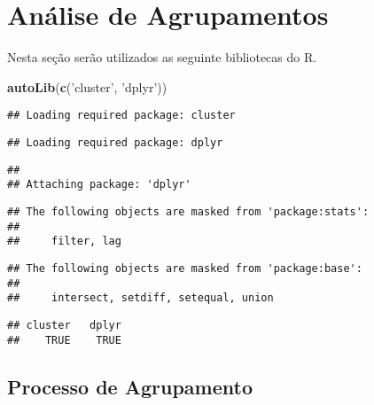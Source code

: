 \documentclass[]{book}
\newenvironment{Shaded}{\begin{snugshade}}{\end{snugshade}}
\newcommand{\KeywordTok}[1]{\textcolor[rgb]{0.13,0.29,0.53}{\textbf{{#1}}}}
\newcommand{\DataTypeTok}[1]{\textcolor[rgb]{0.13,0.29,0.53}{{#1}}}
\newcommand{\DecValTok}[1]{\textcolor[rgb]{0.00,0.00,0.81}{{#1}}}
\newcommand{\StringTok}[1]{\textcolor[rgb]{0.31,0.60,0.02}{{#1}}}
\newcommand{\NormalTok}[1]{{#1}}
\begin{document}
\chapter{Análise de Agrupamentos}\label{AA}

Nesta seção serão utilizados as seguinte bibliotecas do R.

\begin{Shaded}
\begin{Highlighting}[]
\KeywordTok{autoLib}\NormalTok{(}\KeywordTok{c}\NormalTok{(}\StringTok{'cluster'}\NormalTok{, }\StringTok{'dplyr'}\NormalTok{))}
\end{Highlighting}
\end{Shaded}

\begin{verbatim}
## Loading required package: cluster
\end{verbatim}

\begin{verbatim}
## Loading required package: dplyr
\end{verbatim}

\begin{verbatim}
## 
## Attaching package: 'dplyr'
\end{verbatim}

\begin{verbatim}
## The following objects are masked from 'package:stats':
## 
##     filter, lag
\end{verbatim}

\begin{verbatim}
## The following objects are masked from 'package:base':
## 
##     intersect, setdiff, setequal, union
\end{verbatim}

\begin{verbatim}
## cluster   dplyr 
##    TRUE    TRUE
\end{verbatim}

\begin{Shaded}
\end{Shaded}

\section{Processo de Agrupamento}\label{AAprocess}
\end{document}
